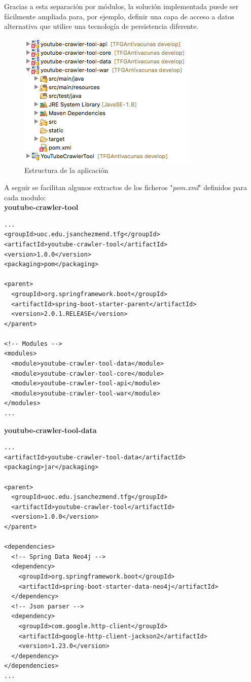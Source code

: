\documentclass[11pt,a4paper]{article}
\begin{document}
Gracias a esta separación por módulos, la solución implementada puede ser fácilmente ampliada para, por ejemplo, definir una capa de acceso a datos alternativa que utilice una tecnología de persistencia diferente.

\begin{figure}[H]
\centering
\includegraphics[scale=0.60]{desarrollo/mvn.png}
\caption{Estructura de la aplicación}
\end{figure}

A seguir se facilitan algunos extractos de los ficheros "\textit{pom.xml}" definidos para cada modulo:
\\

\noindent\textbf{youtube-crawler-tool}
\begin{lstlisting}[style=C]
...
<groupId>uoc.edu.jsanchezmend.tfg</groupId>
<artifactId>youtube-crawler-tool</artifactId>
<version>1.0.0</version>
<packaging>pom</packaging>

<parent>
  <groupId>org.springframework.boot</groupId>
  <artifactId>spring-boot-starter-parent</artifactId>
  <version>2.0.1.RELEASE</version>
</parent>
	
<!-- Modules -->
<modules>
  <module>youtube-crawler-tool-data</module>
  <module>youtube-crawler-tool-core</module>
  <module>youtube-crawler-tool-api</module>
  <module>youtube-crawler-tool-war</module>
</modules>
...
\end{lstlisting}
\medskip

\noindent\textbf{youtube-crawler-tool-data}
\begin{lstlisting}[style=C]
...
<artifactId>youtube-crawler-tool-data</artifactId>
<packaging>jar</packaging>

<parent>
  <groupId>uoc.edu.jsanchezmend.tfg</groupId>
  <artifactId>youtube-crawler-tool</artifactId>
  <version>1.0.0</version>
</parent>
    
<dependencies>
  <!-- Spring Data Neo4j -->
  <dependency>
    <groupId>org.springframework.boot</groupId>
    <artifactId>spring-boot-starter-data-neo4j</artifactId>
  </dependency>
  <!-- Json parser -->
  <dependency>
    <groupId>com.google.http-client</groupId>
    <artifactId>google-http-client-jackson2</artifactId>
    <version>1.23.0</version>
  </dependency>
</dependencies>
...
\end{lstlisting}
\medskip
\end{document}
